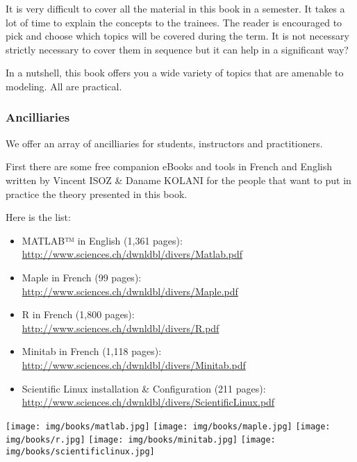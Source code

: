 	It is very difficult to cover all the material in this book in a semester. It takes a lot of time to explain the concepts to the trainees. The reader is encouraged to pick and choose which topics will be covered during the term. It is not necessary strictly necessary to cover them in sequence but it can help in a significant way?

	In a nutshell, this book offers you a wide variety of topics that are amenable to modeling. All are practical.
	
	\subsubsection{Ancilliaries}
	We offer an array of ancilliaries for students, instructors and practitioners.
	
	First there are some free companion eBooks and tools in French and English written by Vincent ISOZ \& Daname KOLANI for the people that want to put in practice the theory presented in this book.
	
	Here is the list:
	\begin{itemize}
		\item MATLAB™ in English (1,361 pages):\\ \href{http://www.sciences.ch/htmlfr/php/cliccount/click.php?id=319}{http://www.sciences.ch/dwnldbl/divers/Matlab.pdf}
		
		\item Maple in French (99 pages):\\ \href{http://www.sciences.ch/dwnldbl/divers/Maple.pdf}{http://www.sciences.ch/dwnldbl/divers/Maple.pdf}
		
		\item \textsf{R} in French (1,800 pages):\\ \href{http://www.sciences.ch/htmlfr/php/cliccount/click.php?id=313}{http://www.sciences.ch/dwnldbl/divers/R.pdf}
		
		\item Minitab in French (1,118 pages):\\ \href{http://www.sciences.ch/htmlfr/php/cliccount/click.php?id=282}{http://www.sciences.ch/dwnldbl/divers/Minitab.pdf}
		
		\item Scientific Linux installation \& Configuration  (211 pages):\\ \href{http://www.sciences.ch/dwnldbl/divers/ScientificLinux.pdf}{http://www.sciences.ch/dwnldbl/divers/ScientificLinux.pdf}
	\end{itemize}
	\begin{center}
		\texttt{[image: img/books/matlab.jpg]}
		\texttt{[image: img/books/maple.jpg]}
		\texttt{[image: img/books/r.jpg]}
		\texttt{[image: img/books/minitab.jpg]}
		\texttt{[image: img/books/scientificlinux.jpg]} 
	\end{center}	
		
